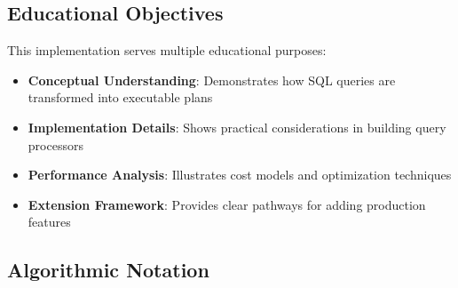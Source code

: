 \documentclass[12pt,a4paper]{article}
\begin{document}
    \subsection{Educational Objectives}

    This implementation serves multiple educational purposes:

    \begin{itemize}
        \item \textbf{Conceptual Understanding}: Demonstrates how SQL queries are transformed into executable plans
        \item \textbf{Implementation Details}: Shows practical considerations in building query processors
        \item \textbf{Performance Analysis}: Illustrates cost models and optimization techniques
        \item \textbf{Extension Framework}: Provides clear pathways for adding production features
    \end{itemize}

    \subsection{Algorithmic Notation}
\end{document}
